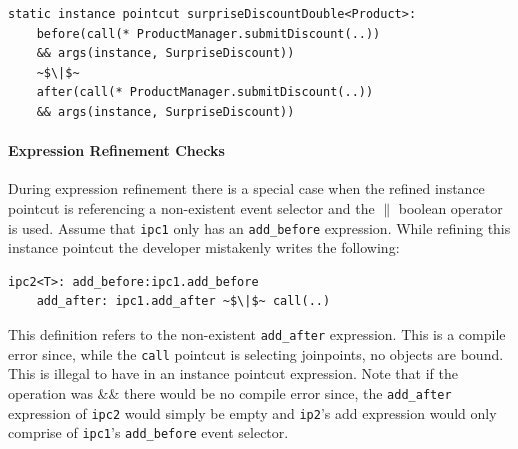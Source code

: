 \documentclass{acm_proc_article-sp}
\newcommand{\lstinln}[1]{\lstinline~#1~}
\begin{document}
\begin{lstlisting}[float=h!, moreemph=instance, caption={Adding the same object before and after the same join-point}, label={lst:objversion}]
static instance pointcut surpriseDiscountDouble<Product>: 
	before(call(* ProductManager.submitDiscount(..)) 
	&& args(instance, SurpriseDiscount)) 
	~$\|$~
	after(call(* ProductManager.submitDiscount(..)) 
	&& args(instance, SurpriseDiscount)) 
\end{lstlisting}

\paragraph*{Expression Refinement Checks}During expression refinement there is a special case when the refined instance pointcut is referencing a non-existent event selector and the $\|$ boolean operator is used.  Assume that \lstinln{ipc1} only has an \lstinln{add_before} expression. While refining this instance pointcut the developer mistakenly writes the following: 

\begin{lstlisting}
ipc2<T>: add_before:ipc1.add_before 
	add_after: ipc1.add_after ~$\|$~ call(..)
\end{lstlisting}

This definition refers to the non-existent \lstinln{add_after} expression. This is a compile error since, while the \lstinln{call} pointcut is selecting joinpoints, no objects are bound.  This is illegal to have in an instance pointcut expression. Note that if the operation was \&\& there would be no compile error since, the \lstinln{add_after} expression of \lstinln{ipc2} would simply be empty and \lstinln{ip2}'s add expression would only comprise of \lstinln{ipc1}'s \lstinln{add_before} event selector. 
\end{document}
